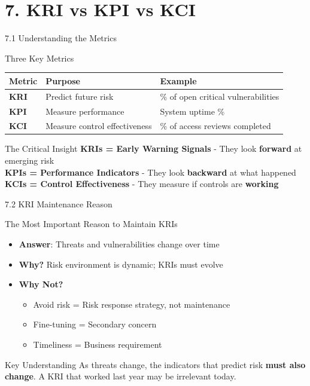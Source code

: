 \documentclass{beamer}
\begin{document}
	\section{7. KRI vs KPI vs KCI}
	
	\begin{frame}{7.1 Understanding the Metrics}
		\begin{block}{Three Key Metrics}
			\begin{tabular}{|p{2.5cm}|p{4cm}|p{4.5cm}|}
				\hline
				\textbf{Metric} & \textbf{Purpose} & \textbf{Example} \\
				\hline
				\textbf{KRI} & Predict future risk & \% of open critical vulnerabilities \\
				\hline
				\textbf{KPI} & Measure performance & System uptime \% \\
				\hline
				\textbf{KCI} & Measure control effectiveness & \% of access reviews completed \\
				\hline
			\end{tabular}
		\end{block}
		
		\begin{alertblock}{The Critical Insight}
			\textbf{KRIs = Early Warning Signals} - They look \textbf{forward} at emerging risk \\
			\textbf{KPIs = Performance Indicators} - They look \textbf{backward} at what happened \\
			\textbf{KCIs = Control Effectiveness} - They measure if controls are \textbf{working}
		\end{alertblock}
	\end{frame}
	
	\begin{frame}{7.2 KRI Maintenance Reason}
		\begin{block}{The Most Important Reason to Maintain KRIs}
			\begin{itemize}
				\item \textbf{Answer}: Threats and vulnerabilities change over time
				\item \textbf{Why?} Risk environment is dynamic; KRIs must evolve
				\item \textbf{Why Not?}
				\begin{itemize}
					\item Avoid risk = Risk response strategy, not maintenance
					\item Fine-tuning = Secondary concern
					\item Timeliness = Business requirement
				\end{itemize}
			\end{itemize}
		\end{block}
		
		\begin{exampleblock}{Key Understanding}
			As threats change, the indicators that predict risk \textbf{must also change}. A KRI that worked last year may be irrelevant today.
		\end{exampleblock}
	\end{frame}
	
\end{document}
